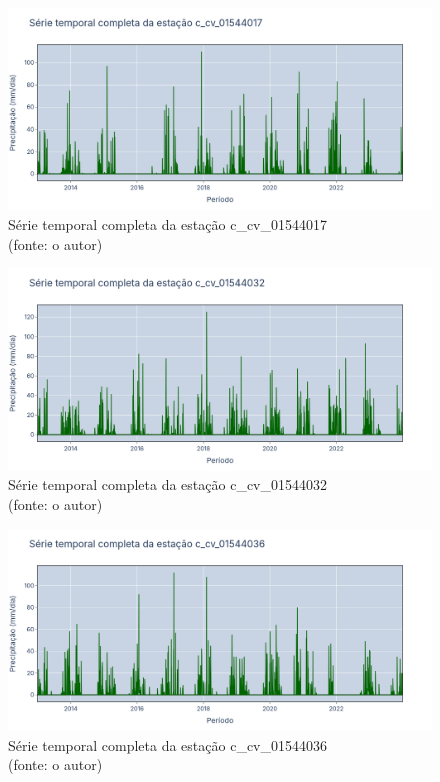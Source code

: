 \begin{figure}[!h]
	\centering
	\includegraphics[scale=0.25]{Figuras/rio_sao_francisco/franciscoSerieCompleta_c_cv_01544017.png}
	\caption{Série temporal completa da estação c\_cv\_01544017\\(fonte: o autor)}
	\label{fig:franciscoSerieCompleta_c_cv_01544017}
\end{figure}

\begin{figure}[!h]
	\centering
	\includegraphics[scale=0.25]{Figuras/rio_sao_francisco/franciscoSerieCompleta_c_cv_01544032.png}
	\caption{Série temporal completa da estação c\_cv\_01544032\\(fonte: o autor)}
	\label{fig:franciscoSerieCompleta_c_cv_01544032}
\end{figure}

\begin{figure}[!h]
	\centering
	\includegraphics[scale=0.25]{Figuras/rio_sao_francisco/franciscoSerieCompleta_c_cv_01544036.png}
	\caption{Série temporal completa da estação c\_cv\_01544036\\(fonte: o autor)}
	\label{fig:franciscoSerieCompleta_c_cv_01544036}
\end{figure}
\clearpage

